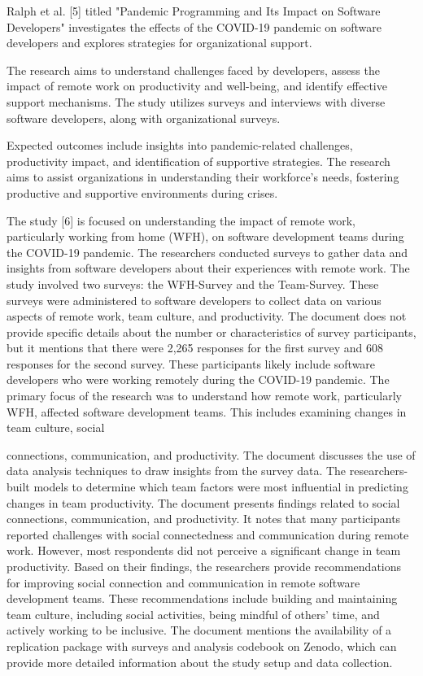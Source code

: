 \documentclass[conference]{IEEEtran}
\begin{document}
Ralph et al. [5] titled "Pandemic Programming and Its Impact on Software Developers" investigates the effects of the COVID-19 pandemic on software developers and explores strategies for organizational support.

The research aims to understand challenges faced by developers, assess the impact of remote work on productivity and well-being, and identify effective support mechanisms. The study utilizes surveys and interviews with diverse software developers, along with organizational surveys.

Expected outcomes include insights into pandemic-related challenges, productivity impact, and identification of supportive strategies. The research aims to assist organizations in understanding their workforce's needs, fostering productive and supportive environments during crises.

The study [6] is focused on understanding the impact of remote work, particularly working from home (WFH), on software development teams during the COVID-19 pandemic. The researchers conducted surveys to gather data and insights from software developers about their experiences with remote work. The study involved two surveys: the WFH-Survey and the Team-Survey. These surveys were administered to software developers to collect data on various aspects of remote work, team culture, and productivity. The document does not provide specific details about the number or characteristics of survey participants, but it mentions that there were 2,265 responses for the first survey and 608 responses for the second survey. These participants likely include software developers who were working remotely during the COVID-19 pandemic. The primary focus of the research was to understand how remote work, particularly WFH, affected software development teams. This includes examining changes in team culture, social

connections, communication, and productivity. The document discusses the use of data analysis techniques to draw insights from the survey data. The researchers-built models to determine which team factors were most influential in predicting changes in team productivity. The document presents findings related to social connections, communication, and productivity. It notes that many participants reported challenges with social connectedness and communication during remote work. However, most respondents did not perceive a significant change in team productivity. Based on their findings, the researchers provide recommendations for improving social connection and communication in remote software development teams. These recommendations include building and maintaining team culture, including social activities, being mindful of others' time, and actively working to be inclusive. The document mentions the availability of a replication package with surveys and analysis codebook on Zenodo, which can provide more detailed information about the study setup and data collection.
\end{document}
